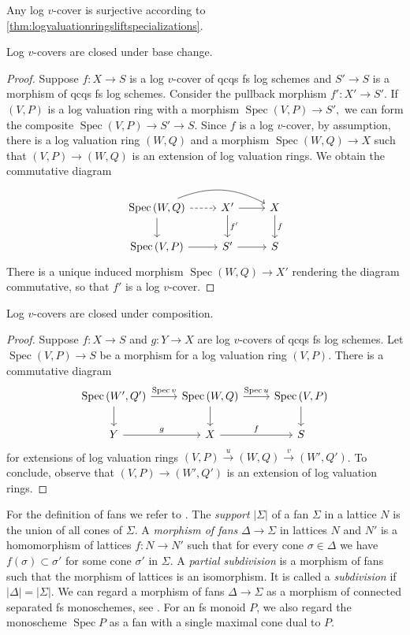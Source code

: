 \documentclass[10pt]{amsart}
\DeclareMathOperator{\Spec}{Spec}
\begin{document}
\begin{remark}
Any log $v$-cover is surjective according to \cref{thm:logvaluationringsliftspecializations}.
\end{remark}

\begin{proposition}\label{prop:logvcoverbasechange}
Log $v$-covers are closed under base change.
\end{proposition}
\begin{proof}
Suppose $f \colon X \to S$ is a log $v$-cover of 
qcqs fs log schemes and $S' \to S$ is a morphism of qcqs fs log schemes. 
Consider the pullback morphism $f' \colon X' \to S'$. 
If $(V,P)$ is a log valuation ring with a morphism $\Spec{(V,P)} \to S',$ 
we can form the composite $\Spec{(V,P)} \to S' \to S$. 
Since $f$ is a log $v$-cover, by assumption, 
there is a log valuation ring $(W,Q)$ and a morphism $\Spec{(W,Q)} \to X$ such that 
$(V,P) \to (W,Q)$ is an extension of log valuation rings. 
We obtain the commutative diagram
\[
\begin{tikzcd}
\Spec{(W,Q)} \ar[rr, bend left=25] \ar[d] \ar[r, dashed]
& X' \ar[r] \ar[d,"f'"] & X \ar[d, "f"] \\
\Spec{(V,P)} \ar[r] & S' \ar[r] & S
\end{tikzcd}
\]
There is a unique induced morphism $\Spec{(W,Q)}\to X'$ rendering the diagram commutative, 
so that $f'$ is a log $v$-cover.
\end{proof}

\begin{proposition}\label{prop:logvcovercomposition}
Log $v$-covers are closed under composition.
\end{proposition}
\begin{proof}
Suppose $f \colon X \to S$ and $g \colon Y \to X$ are log $v$-covers of qcqs fs log schemes. 
Let $\Spec{(V,P)} \to S$ be a morphism for a log valuation ring $(V,P)$.
There is a commutative diagram
\[
\begin{tikzcd}
\Spec{(W',Q')}\ar[d]\ar[r,"\Spec{v}"]&
\Spec{(W,Q)}\ar[d]\ar[r,"\Spec{u}"]&
\Spec{(V,P)}\ar[d]
\\
Y\ar[r,"g"]&
X\ar[r,"f"]&
S
\end{tikzcd}
\]
for extensions of log valuation rings $(V,P)\xrightarrow{u} (W,Q)\xrightarrow{v} (W',Q')$.
To conclude,
observe that $(V,P)\to (W',Q')$ is an extension of log valuation rings.
\end{proof}

For the definition of fans we refer to \cite[\S II.1.9]{Ogu}.
The \textit{support} $|\Sigma|$ of a fan $\Sigma$ in a lattice $N$ is the union of all cones of $\Sigma.$
A \emph{morphism of fans} $\Delta\to \Sigma$ in lattices $N$ and $N'$ is a homomorphism of lattices $f \colon N \to N'$ such that for every cone $\sigma\in \Delta$ we have $f(\sigma) \subset \sigma'$ for some cone $\sigma'$ in $\Sigma$. 
A \textit{partial subdivision} is a morphism of fans such that the morphism of lattices is an isomorphism. It is called a \textit{subdivision} if $|\Delta| = |\Sigma|.$
We can regard a morphism of fans $\Delta\to \Sigma$ as a morphism of connected separated fs monoschemes, see \cite[Theorem II.1.9.3]{Ogu}. 
For an fs monoid $P$, we also regard the monoscheme $\Spec{P}$ 
as a fan with a single maximal cone dual to $P$.
\end{document}
